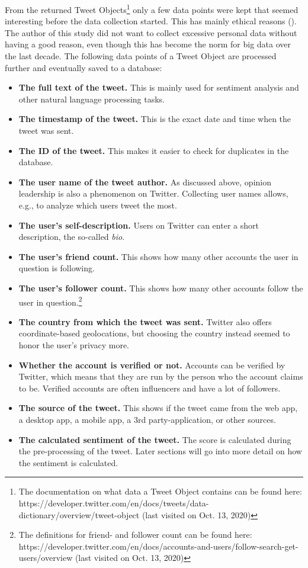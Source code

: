 From the returned Tweet Objects\footnote{The documentation on what data a Tweet Object contains can be found here: https://developer.twitter.com/en/docs/tweets/data-dictionary/overview/tweet-object (last visited on Oct. 13, 2020)} only a few data points were kept that seemed interesting before the data collection started. This has mainly ethical reasons (\cite{richards2014big}). The author of this study did not want to collect excessive personal data without having a good reason, even though this has become the norm for big data over the last decade. The following data points of a Tweet Object are processed further and eventually saved to a database:

\begin{itemize}
\item \textbf{The full text of the tweet.} This is mainly used for sentiment analysis and other natural language processing tasks.
\item \textbf{The timestamp of the tweet.} This is the exact date and time when the tweet was sent.
\item \textbf{The ID of the tweet.} This makes it easier to check for duplicates in the database. 
\item \textbf{The user name of the tweet author.} As discussed above, opinion leadership is also a phenomenon on Twitter. Collecting user names allows, e.g., to analyze which users tweet the most.
\item \textbf{The user's self-description.} Users on Twitter can enter a short description, the so-called \emph{bio}.
\item \textbf{The user's friend count.} This shows how many other accounts the user in question is following.
\item \textbf{The user's follower count.} This shows how many other accounts follow the user in question.\footnote{The definitions for friend- and follower count can be found here: https://developer.twitter.com/en/docs/accounts-and-users/follow-search-get-users/overview (last visited on Oct. 13, 2020)}
\item \textbf{The country from which the tweet was sent.} Twitter also offers coordinate-based geolocations, but choosing the country instead seemed to honor the user's privacy more.
\item \textbf{Whether the account is verified or not.} Accounts can be verified by Twitter, which means that they are run by the person who the account claims to be. Verified accounts are often influencers and have a lot of followers.
\item \textbf{The source of the tweet.} This shows if the tweet came from the web app, a desktop app, a mobile app, a 3rd party-application, or other sources.
\item \textbf{The calculated sentiment of the tweet.} The score is calculated during the pre-processing of the tweet. Later sections will go into more detail on how the sentiment is calculated.
\end{itemize}

